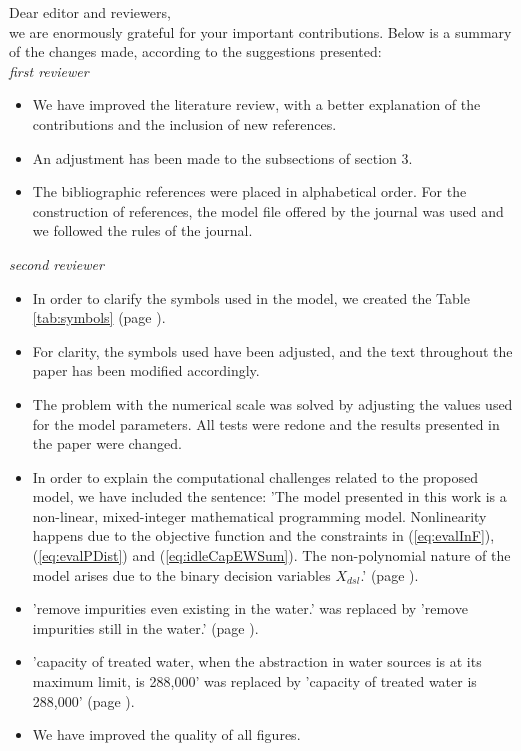 \documentclass{singlecol}
\theoremstyle{TH}{
\newtheorem{lemma}{Lemma}
\newtheorem{theorem}[lemma]{Theorem}
\newtheorem{corrolary}[lemma]{Corrolary}
\newtheorem{conjecture}[lemma]{Conjecture}
\newtheorem{proposition}[lemma]{Proposition}
\newtheorem{claim}[lemma]{Claim}
\newtheorem{stheorem}[lemma]{Wrong Theorem}
\newtheorem{algorithm}{Algorithm}
}
\theoremstyle{THrm}{
\newtheorem{definition}{Definition}[section]
\newtheorem{question}{Question}[section]
\newtheorem{remark}{Remark}
\newtheorem{scheme}{Scheme}
}
\theoremstyle{THhit}{
\newtheorem{case}{Case}[section]
}
\begin{document}
%


Dear editor and reviewers, \\

we are enormously grateful for your important contributions. Below is a summary of the changes made, according to the suggestions presented: \\

\emph{first reviewer}

\begin{itemize}
\item We have improved the literature review, with a better explanation of the contributions and the inclusion of new references.
\item An adjustment has been made to the subsections of section 3.
\item The bibliographic references were placed in alphabetical order. For the construction of references, the model file offered by the journal was used and we  followed the rules of the journal.

\end{itemize}

\emph{second reviewer}

\begin{itemize}
\item In order to clarify the symbols used in the model, we created the Table \ref{tab:symbols} (page \pageref{tab:symbols}).
\item For clarity, the symbols used have been adjusted, and the text throughout the paper has been modified accordingly.
\item The problem with the numerical scale was solved by adjusting the values used for the model parameters. All tests were redone and the results presented in the paper were changed.
\item In order to explain the computational challenges related to the proposed model, we have included the sentence: 'The model presented in this work is a non-linear, mixed-integer mathematical programming model. Nonlinearity happens due to the objective function and the constraints in (\ref{eq:evalInF}), (\ref{eq:evalPDist}) and (\ref{eq:idleCapEWSum}). The non-polynomial nature of the model arises due to the binary decision variables $X_{dsl}$.' (page \pageref{nonlinerarityExp}).
\item 'remove impurities even existing in the water.' was replaced by 'remove impurities still in the water.' (page \pageref{firstChange}).
\item 'capacity of treated water, when the abstraction in water sources is at its maximum limit, is 288,000' was replaced by 'capacity of treated water is 288,000' (page \pageref{secondChange}).
\item We have improved the quality of all figures.
\end{itemize}
\end{document}
